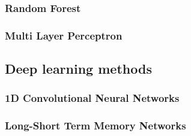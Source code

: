 \subsubsection{Random Forest}

\subsubsection{Multi Layer Perceptron}

\subsection{Deep learning methods}	

\subsubsection{1D Convolutional Neural Networks}

\subsubsection{Long-Short Term Memory Networks}
	
